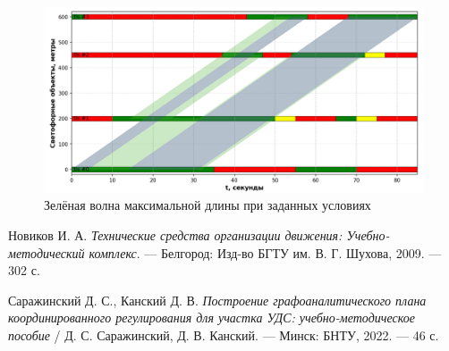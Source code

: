 \documentclass[12pt]{article}
\begin{document}
\begin{figure}[h!]
  \centering
  \includegraphics[width=1.1\textwidth]{images/Final.png} 
  \caption{Зелёная волна максимальной длины при заданных условиях} 
  \label{fig:diagram} 
\end{figure}

\begin{thebibliography}{9}
Новиков И. А. 
\textit{Технические средства организации движения: Учебно-методический комплекс}. — Белгород: Изд-во БГТУ им. В. Г. Шухова, 2009. — 302 с.

Саражинский Д. С., Канский Д. В. 
\textit{Построение графоаналитического плана координированного регулирования для участка УДС: учебно-методическое пособие} / Д. С. Саражинский, Д. В. Канский. — Минск: БНТУ, 2022. — 46 с. 
\end{thebibliography}
\end{document}
